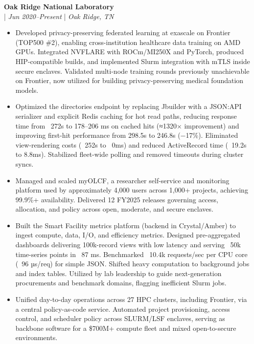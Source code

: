 \documentclass[11pt,a4paper]{article}
\newcommand{\regbullet}[1]{
    \item {\fontsize{10}{12}\selectfont #1}
}
\begin{document}
\noindent\textbf{Oak Ridge National Laboratory}\\
  |  {\fontsize{10}{12}\selectfont\textit{Jun 2020--Present}}  |  {\fontsize{10}{12}\selectfont\textit{Oak Ridge, TN}}
\begin{itemize}[leftmargin=18pt,itemsep=1pt,topsep=0pt]
\regbullet{Developed privacy-preserving federated learning at exascale on Frontier (TOP500 \#2), enabling cross-institution healthcare data training on AMD GPUs. Integrated NVFLARE with ROCm/MI250X and PyTorch, produced HIP-compatible builds, and implemented Slurm integration with mTLS inside secure enclaves. Validated multi-node training rounds previously unachievable on Frontier, now utilized for building privacy-preserving medical foundation models.}

\regbullet{Optimized the directories endpoint by replacing Jbuilder with a JSON:API serializer and explicit Redis caching for hot read paths, reducing response time from ~272s to 178--206 ms on cached hits (≈1320× improvement) and improving first-hit performance from 298.5s to 246.8s (−17\%). Eliminated view-rendering costs (~252s to ~0ms) and reduced ActiveRecord time (~19.2s to 8.8ms). Stabilized fleet-wide polling and removed timeouts during cluster syncs.}

\regbullet{Managed and scaled myOLCF, a researcher self-service and monitoring platform used by approximately 4,000 users across 1,000+ projects, achieving 99.9\%+ availability. Delivered 12 FY2025 releases governing access, allocation, and policy across open, moderate, and secure enclaves.}

\regbullet{Built the Smart Facility metrics platform (backend in Crystal/Amber) to ingest compute, data, I/O, and efficiency metrics. Designed pre-aggregated dashboards delivering 100k-record views with low latency and serving ~50k time-series points in ~87 ms. Benchmarked ~10.4k requests/sec per CPU core (~96 µs/req) for simple JSON. Shifted heavy computation to background jobs and index tables. Utilized by lab leadership to guide next-generation procurements and benchmark domains, flagging inefficient Slurm jobs.}

\regbullet{Unified day-to-day operations across 27 HPC clusters, including Frontier, via a central policy-as-code service. Automated project provisioning, access control, and scheduler policy across SLURM/LSF enclaves, serving as backbone software for a \$700M+ compute fleet and mixed open-to-secure environments.}


\end{itemize}
\end{document}
